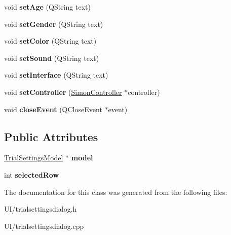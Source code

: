 \begin{DoxyCompactItemize}
\item 
\hypertarget{class_trial_settings_dialog_a99bb91c236188b87c235d81e15d1150b}{void {\bfseries set\+Age} (Q\+String text)}\label{class_trial_settings_dialog_a99bb91c236188b87c235d81e15d1150b}

\item 
\hypertarget{class_trial_settings_dialog_a239811adac2660a8e638addd9dc539d7}{void {\bfseries set\+Gender} (Q\+String text)}\label{class_trial_settings_dialog_a239811adac2660a8e638addd9dc539d7}

\item 
\hypertarget{class_trial_settings_dialog_a19c0c34ab166820828d0e0b2f0044ce6}{void {\bfseries set\+Color} (Q\+String text)}\label{class_trial_settings_dialog_a19c0c34ab166820828d0e0b2f0044ce6}

\item 
\hypertarget{class_trial_settings_dialog_a1658d75ea686b5a6590b4d7bf49f96af}{void {\bfseries set\+Sound} (Q\+String text)}\label{class_trial_settings_dialog_a1658d75ea686b5a6590b4d7bf49f96af}

\item 
\hypertarget{class_trial_settings_dialog_a50dec32d81641b43870111477638b0db}{void {\bfseries set\+Interface} (Q\+String text)}\label{class_trial_settings_dialog_a50dec32d81641b43870111477638b0db}

\item 
\hypertarget{class_trial_settings_dialog_a7475457608a9f46e6333953c0aef5dbd}{void {\bfseries set\+Controller} (\hyperlink{class_simon_controller}{Simon\+Controller} $\ast$controller)}\label{class_trial_settings_dialog_a7475457608a9f46e6333953c0aef5dbd}

\item 
\hypertarget{class_trial_settings_dialog_ae89add86a0324bde8f8c0b09ccea823d}{void {\bfseries close\+Event} (Q\+Close\+Event $\ast$event)}\label{class_trial_settings_dialog_ae89add86a0324bde8f8c0b09ccea823d}

\end{DoxyCompactItemize}
\subsection*{Public Attributes}
\begin{DoxyCompactItemize}
\item 
\hypertarget{class_trial_settings_dialog_a5243d4d7bcfabb3d97200339581bf434}{\hyperlink{class_trial_settings_model}{Trial\+Settings\+Model} $\ast$ {\bfseries model}}\label{class_trial_settings_dialog_a5243d4d7bcfabb3d97200339581bf434}

\item 
\hypertarget{class_trial_settings_dialog_a9c05bec82d70470481901b17df4ce07e}{int {\bfseries selected\+Row}}\label{class_trial_settings_dialog_a9c05bec82d70470481901b17df4ce07e}

\end{DoxyCompactItemize}


The documentation for this class was generated from the following files\+:\begin{DoxyCompactItemize}
\item 
U\+I/trialsettingsdialog.\+h\item 
U\+I/trialsettingsdialog.\+cpp\end{DoxyCompactItemize}
